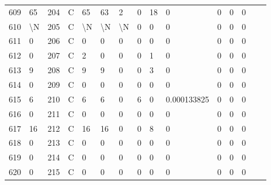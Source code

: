 \begin{longtable}{lllllllllllllll}
	609 & 65                & 204 & C   & 65                & 63                & 2                 & 0    & 18         & 0              & 0              & 0             & 0            \\
	610 & \textbackslash{}N & 205 & C   & \textbackslash{}N & \textbackslash{}N & \textbackslash{}N & 0    & 0          & 0              & 0              & 0             & 0            \\
	611 & 0                 & 206 & C   & 0                 & 0                 & 0                 & 0    & 0          & 0              & 0              & 0             & 0            \\
	612 & 0                 & 207 & C   & 2                 & 0                 & 0                 & 0    & 1          & 0              & 0              & 0             & 0            \\
	613 & 9                 & 208 & C   & 9                 & 9                 & 0                 & 0    & 3          & 0              & 0              & 0             & 0            \\
	614 & 0                 & 209 & C   & 0                 & 0                 & 0                 & 0    & 0          & 0              & 0              & 0             & 0            \\
	615 & 6                 & 210 & C   & 6                 & 6                 & 0                 & 6    & 0          & 0.000133825    & 0              & 0             & 0            \\
	616 & 0                 & 211 & C   & 0                 & 0                 & 0                 & 0    & 0          & 0              & 0              & 0             & 0            \\
	617 & 16                & 212 & C   & 16                & 16                & 0                 & 0    & 8          & 0              & 0              & 0             & 0            \\
	618 & 0                 & 213 & C   & 0                 & 0                 & 0                 & 0    & 0          & 0              & 0              & 0             & 0            \\
	619 & 0                 & 214 & C   & 0                 & 0                 & 0                 & 0    & 0          & 0              & 0              & 0             & 0            \\
	620 & 0                 & 215 & C   & 0                 & 0                 & 0                 & 0    & 0          & 0              & 0              & 0             & 0            \\

\end{longtable}
